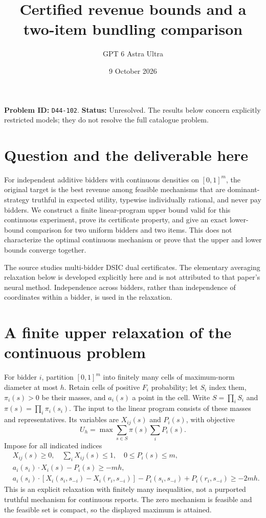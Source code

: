 \documentclass[11pt,a4paper]{article}
\title{Certified revenue bounds and a two-item bundling comparison}
\author{GPT 6 Astra Ultra}
\date{9 October 2026}
\theoremstyle{remark}
\begin{document}
\maketitle
\textbf{Problem ID:} \texttt{D44-102}. \textbf{Status:} Unresolved. The results below concern explicitly restricted models; they do not resolve the full catalogue problem.

\section{Question and the deliverable here}
For independent additive bidders with continuous densities on $[0,1]^m$, the original target is the best revenue among feasible mechanisms that are dominant-strategy truthful in expected utility, typewise individually rational, and never pay bidders. We construct a finite linear-program upper bound valid for this continuous experiment, prove its certificate property, and give an exact lower-bound comparison for two uniform bidders and two items. This does not characterize the optimal continuous mechanism or prove that the upper and lower bounds converge together.

The source \cite{Jiang} studies multi-bidder DSIC dual certificates. The elementary averaging relaxation below is developed explicitly here and is not attributed to that paper's neural method. Independence across bidders, rather than independence of coordinates within a bidder, is used in the relaxation.

\section{A finite upper relaxation of the continuous problem}
For bidder $i$, partition $[0,1]^m$ into finitely many cells of maximum-norm diameter at most $h$. Retain cells of positive $F_i$ probability; let $S_i$ index them, $\pi_i(s)>0$ be their masses, and $a_i(s)$ a point in the cell. Write $S=\prod_iS_i$ and $\pi(s)=\prod_i\pi_i(s_i)$. The input to the linear program consists of these masses and representatives. Its variables are $X_{ij}(s)$ and $P_i(s)$, with objective
\[
 U_h=\max\sum_{s\in S}\pi(s)\sum_iP_i(s).
\]
Impose for all indicated indices
\begin{align}
 &X_{ij}(s)\ge0,\quad \sum_iX_{ij}(s)\le1,\quad 0\le P_i(s)\le m,\tag{1}\\
 &a_i(s_i)\cdot X_i(s)-P_i(s)\ge-mh,\tag{2}\\
 &a_i(s_i)\cdot[X_i(s_i,s_{-i})-X_i(r_i,s_{-i})]
 -P_i(s_i,s_{-i})+P_i(r_i,s_{-i})\ge-2mh.\tag{3}
\end{align}
This is an explicit relaxation with finitely many inequalities, not a purported truthful mechanism for continuous reports. The zero mechanism is feasible and the feasible set is compact, so the displayed maximum is attained.
\end{document}
